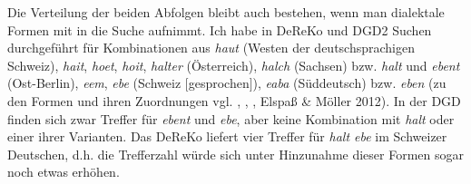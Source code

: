 Die Verteilung der beiden Abfolgen bleibt auch bestehen, wenn man dialektale Formen mit in die Suche aufnimmt. Ich habe in DeReKo und DGD2 Suchen durchgeführt für Kombinationen aus \textit{haut} (Westen der deutschsprachigen Schweiz), \textit{hait}, \textit{hoet}, \textit{hoit}, \textit{halter} (Österreich), \textit{halch} (Sachsen) bzw. \textit{halt} und \textit{ebent} (Ost-Berlin),\textit{ eem}, \textit{ebe} (Schweiz $[$gesprochen$]$), \textit{eaba} (Süddeutsch) bzw. \textit{eben} (zu den Formen und ihren Zuordnungen vgl. \citealt[167]{Protze1997}, \citealt[16]{Elspass2005}, \citealt[31]{Eichhoff1978}, Elspaß \& Möller 2012). In der DGD finden sich zwar Treffer für \textit{ebent} und \textit{ebe}, aber keine Kombination mit \textit{halt} oder einer ihrer Varianten. Das DeReKo liefert vier Treffer für \textit{halt ebe} im Schweizer Deutschen, d.h. die Trefferzahl würde sich unter Hinzunahme dieser Formen sogar noch etwas erhöhen.

